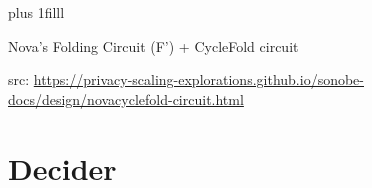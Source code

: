 \documentclass[t]{beamer} \usefonttheme[onlymath]{serif}
\begin{document}
{
\begin{frame}[plain]
  \vskip0pt plus 1filll
  {\tiny 
    Nova's Folding Circuit (F') + CycleFold circuit

    src: \href{https://privacy-scaling-explorations.github.io/sonobe-docs/design/novacyclefold-circuit.html}{https://privacy-scaling-explorations.github.io/sonobe-docs/design/novacyclefold-circuit.html}
  }
\end{frame}
}


\section{Decider}
\end{document}
